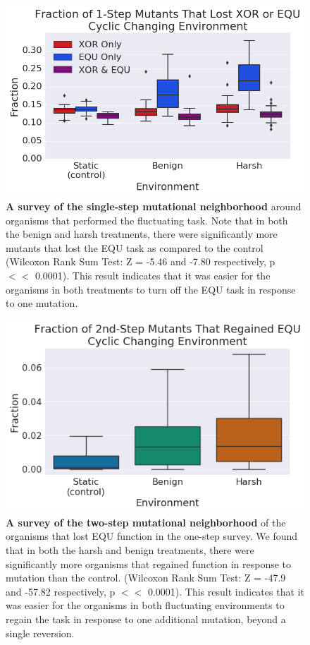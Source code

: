 \documentclass[PhD]{msu-thesis}
\begin{document}
	\begin{figure}[!h] %
	\includegraphics[trim={0.2cm 0 0 0.2cm},clip,width=0.75\columnwidth]{figures/CE/CCE_frac_1step__box.png}
	\caption{\textbf{A survey of the single-step mutational neighborhood} around organisms that performed the fluctuating task. Note that in both the benign and harsh treatments, there were significantly more mutants that lost the EQU task as compared to the control (Wilcoxon Rank Sum Test: Z = -5.46 and -7.80 respectively, p $<<$ 0.0001). This result indicates that it was easier for the organisms in both treatments to turn off the EQU task in response to one mutation. 
	}\label{fig:CCE_single_step}

	\end{figure}
	\begin{figure}[!h] %
	\includegraphics[width=0.75\columnwidth]{figures/CE/CCE_frac_2step__box.png}
	\caption{\textbf{A survey of the two-step mutational neighborhood} of the organisms that lost EQU function in the one-step survey. We found that in both the harsh and benign treatments, there were significantly more organisms that regained function in response to mutation than the control. (Wilcoxon Rank Sum Test: Z = -47.9 and -57.82 respectively, p $<<$ 0.0001). This result indicates that it was easier for the organisms in both fluctuating environments to regain the task in response to one additional mutation, beyond a single reversion. 
	}\label{fig:CCE_two_step}
	\end{figure}
\end{document}
